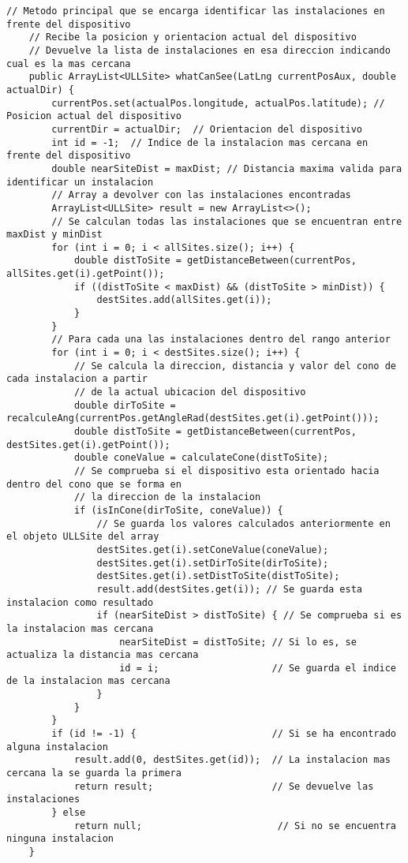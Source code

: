 \begin{lstlisting}[caption={Método principal que realiza el cálculo que permite reconocer las instalaciones en frente al dispositivo móvil.}, label={lst:whatCanSee}]
    // Metodo principal que se encarga identificar las instalaciones en frente del dispositivo
    // Recibe la posicion y orientacion actual del dispositivo
    // Devuelve la lista de instalaciones en esa direccion indicando cual es la mas cercana 
    public ArrayList<ULLSite> whatCanSee(LatLng currentPosAux, double actualDir) {
        currentPos.set(actualPos.longitude, actualPos.latitude); // Posicion actual del dispositivo
        currentDir = actualDir;  // Orientacion del dispositivo
        int id = -1;  // Indice de la instalacion mas cercana en frente del dispositivo
        double nearSiteDist = maxDist; // Distancia maxima valida para identificar un instalacion
        // Array a devolver con las instalaciones encontradas
        ArrayList<ULLSite> result = new ArrayList<>(); 
        // Se calculan todas las instalaciones que se encuentran entre maxDist y minDist
        for (int i = 0; i < allSites.size(); i++) {
            double distToSite = getDistanceBetween(currentPos, allSites.get(i).getPoint());
            if ((distToSite < maxDist) && (distToSite > minDist)) {
                destSites.add(allSites.get(i));
            }
        }
        // Para cada una las instalaciones dentro del rango anterior 
        for (int i = 0; i < destSites.size(); i++) {  
            // Se calcula la direccion, distancia y valor del cono de cada instalacion a partir 
            // de la actual ubicacion del dispositivo
            double dirToSite = recalculeAng(currentPos.getAngleRad(destSites.get(i).getPoint()));
            double distToSite = getDistanceBetween(currentPos, destSites.get(i).getPoint());
            double coneValue = calculateCone(distToSite);
            // Se comprueba si el dispositivo esta orientado hacia dentro del cono que se forma en  
            // la direccion de la instalacion
            if (isInCone(dirToSite, coneValue)) { 
                // Se guarda los valores calculados anteriormente en el objeto ULLSite del array
                destSites.get(i).setConeValue(coneValue); 
                destSites.get(i).setDirToSite(dirToSite); 
                destSites.get(i).setDistToSite(distToSite); 
                result.add(destSites.get(i)); // Se guarda esta instalacion como resultado
                if (nearSiteDist > distToSite) { // Se comprueba si es la instalacion mas cercana
                    nearSiteDist = distToSite; // Si lo es, se actualiza la distancia mas cercana
                    id = i;                    // Se guarda el indice de la instalacion mas cercana
                }
            }
        }
        if (id != -1) {                        // Si se ha encontrado alguna instalacion
            result.add(0, destSites.get(id));  // La instalacion mas cercana la se guarda la primera
            return result;                     // Se devuelve las instalaciones                   
        } else
            return null;                        // Si no se encuentra ninguna instalacion
    }
\end{lstlisting}


